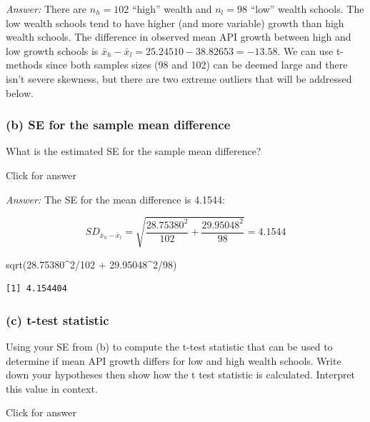 \documentclass[
]{book}
\newenvironment{Shaded}{\begin{snugshade}}{\end{snugshade}}
\newcommand{\DecValTok}[1]{\textcolor[rgb]{0.00,0.00,0.81}{#1}}
\newcommand{\FloatTok}[1]{\textcolor[rgb]{0.00,0.00,0.81}{#1}}
\newcommand{\FunctionTok}[1]{\textcolor[rgb]{0.00,0.00,0.00}{#1}}
\newcommand{\NormalTok}[1]{#1}
\newcommand{\SpecialCharTok}[1]{\textcolor[rgb]{0.00,0.00,0.00}{#1}}
\begin{document}
\emph{Answer:} There are \(n_h = 102\) ``high'' wealth and \(n_l = 98\) ``low'' wealth schools. The low wealth schools tend to have higher (and more variable) growth than high wealth schools. The difference in observed mean API growth between high and low growth schools is \(\bar{x}_h - \bar{x}_l = 25.24510 - 38.82653 = -13.58\). We can use t-methods since both samples sizes (98 and 102) can be deemed large and there isn't severe skewness, but there are two extreme outliers that will be addressed below.

\hypertarget{b-se-for-the-sample-mean-difference}{%
\subsubsection{(b) SE for the sample mean difference}\label{b-se-for-the-sample-mean-difference}}

What is the estimated SE for the sample mean difference?

Click for answer

\emph{Answer:} The SE for the mean difference is 4.1544:

\[
SD_{\bar{x}_h - \bar{x}_l} = \sqrt{\dfrac{28.75380^2}{102} + \dfrac{29.95048^2}{98}} = 4.1544
\]

\begin{Shaded}
\begin{Highlighting}[]
\FunctionTok{sqrt}\NormalTok{(}\FloatTok{28.75380}\SpecialCharTok{\^{}}\DecValTok{2}\SpecialCharTok{/}\DecValTok{102} \SpecialCharTok{+}  \FloatTok{29.95048}\SpecialCharTok{\^{}}\DecValTok{2}\SpecialCharTok{/}\DecValTok{98}\NormalTok{)}
\end{Highlighting}
\end{Shaded}

\begin{verbatim}
[1] 4.154404
\end{verbatim}

\hypertarget{c-t-test-statistic-1}{%
\subsubsection{(c) t-test statistic}\label{c-t-test-statistic-1}}

Using your SE from (b) to compute the t-test statistic that can be used to determine if mean API growth differs for low and high wealth schools. Write down your hypotheses then show how the t test statistic is calculated. Interpret this value in context.

Click for answer
\end{document}
